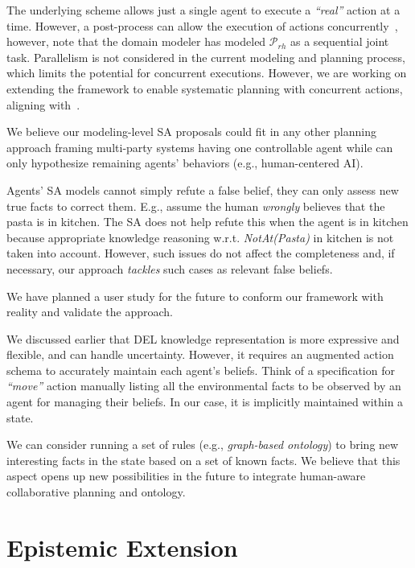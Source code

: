 {The underlying scheme allows just a single agent to execute a \textit{``real''} action at a time. 
However, a post-process can allow the execution of actions concurrently~\cite{CrosbyJR14}, however, note that the domain modeler has modeled $\mathcal{P}_{rh}$ as a sequential joint task. 
Parallelism is not considered in the current modeling and planning process, which limits the potential for concurrent executions. However, we are working on extending the framework to enable systematic planning with concurrent actions, aligning with~\cite{ShekharB20}.

We believe our modeling-level SA proposals could fit in any other planning approach framing multi-party systems having one controllable agent while can only hypothesize remaining agents' behaviors (e.g., human-centered AI).

Agents' SA models cannot simply refute a false belief, they can only assess new true facts to correct them.
E.g., assume the human \textit{wrongly} believes that the pasta is in \textsf{kitchen}. The SA does not help refute this when the agent is in \textsf{kitchen}
because appropriate knowledge reasoning w.r.t. \textit{NotAt(Pasta)} in \textsf{kitchen} is not taken into account.  
However, such issues do not affect the completeness and, if necessary, our approach \textit{tackles} such cases as relevant false beliefs.

We have planned a user study for the future to conform our framework with reality and validate the approach.

We discussed earlier that DEL knowledge representation is more expressive and flexible, and can handle uncertainty. However, it requires an augmented action schema to accurately maintain each agent's beliefs.
Think of a specification for \textit{``move''} action manually listing all the environmental facts to be observed by an agent for managing their beliefs. In our case, it is implicitly maintained within a state.

We can consider running a set of rules (e.g., \textit{graph-based ontology}) to bring new interesting facts in the state based on a set of known facts. We believe that this aspect opens up new possibilities in the future to integrate human-aware collaborative planning and ontology.

\section{Epistemic Extension}

}
